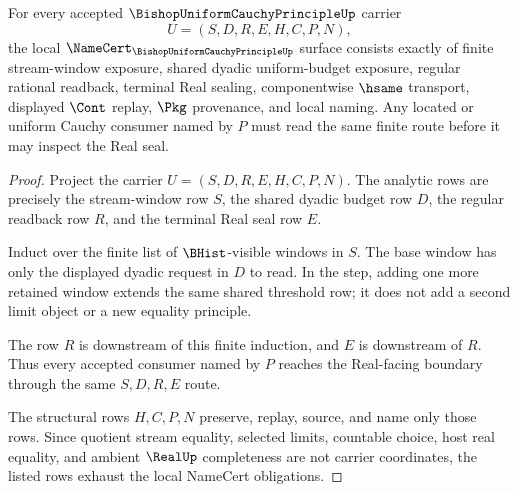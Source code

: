 \begin{theorem}
\label{thm:bishop-uniform-cauchy-principle-namecert-obligations}
For every accepted $\BishopUniformCauchyPrincipleUp$ carrier
$$
U=(S,D,R,E,H,C,P,N),
$$
the local $\NameCert_{\BishopUniformCauchyPrincipleUp}$ surface consists exactly of finite stream-window exposure, shared dyadic uniform-budget exposure, regular rational readback, terminal Real sealing, componentwise $\hsame$ transport, displayed $\Cont$ replay, $\Pkg$ provenance, and local naming. Any located or uniform Cauchy consumer named by $P$ must read the same finite route before it may inspect the Real seal.
\end{theorem}
\begin{proof}
Project the carrier $U=(S,D,R,E,H,C,P,N)$. The analytic rows are precisely the stream-window row $S$, the shared dyadic budget row $D$, the regular readback row $R$, and the terminal Real seal row $E$.

Induct over the finite list of $\BHist$-visible windows in $S$. The base window has only the displayed dyadic request in $D$ to read. In the step, adding one more retained window extends the same shared threshold row; it does not add a second limit object or a new equality principle.

The row $R$ is downstream of this finite induction, and $E$ is downstream of $R$. Thus every accepted consumer named by $P$ reaches the Real-facing boundary through the same $S,D,R,E$ route.

The structural rows $H,C,P,N$ preserve, replay, source, and name only those rows. Since quotient stream equality, selected limits, countable choice, host real equality, and ambient $\RealUp$ completeness are not carrier coordinates, the listed rows exhaust the local NameCert obligations.
\end{proof}

